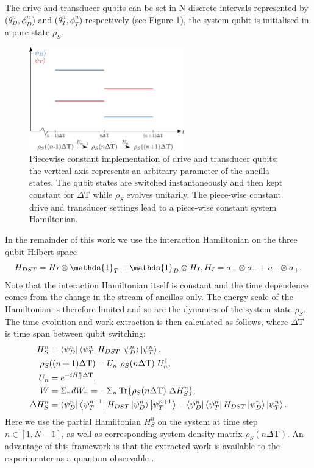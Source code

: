 The drive and transducer qubits can be set in N discrete intervals represented by ($\theta_D^n, \phi_D^n$) and ($\theta_T^n, \phi_T^n$) respectively (see Figure \ref{pwc}), the system qubit is initialised in a pure state $\rho_S$.

\begin{figure}[h]
	\centering
	\includegraphics[width=0.6\textwidth]{img/pwc2}
	\caption{Piecewise constant implementation of drive and transducer qubits: the vertical axis represents an arbitrary parameter of the ancilla states. The qubit states are switched instantaneously and then kept constant for $\Delta \mathrm{T}$ while $\rho_S$ evolves unitarily. The piece-wise constant drive and transducer settings lead to a piece-wise constant system Hamiltonian.}
	\label{pwc}
\end{figure}

\newpage

In the remainder of this work we use the interaction Hamiltonian on the three qubit Hilbert space
\begin{equation*}
H_{DST} = H_{I} \otimes \mathds{1}_T + \mathds{1}_D \otimes H_{I}, \\
H_{I} = \sigma_{+} \otimes \sigma_{-} + \sigma_{-} \otimes \sigma_{+}.
\end{equation*}
Note that the interaction Hamiltonian itself is constant and the time dependence comes from the change in the stream of ancillas only.
The energy scale of the Hamiltonian is therefore limited and so are the dynamics of the system state $\rho_S$.
The time evolution and work extraction is then calculated as follows, where $\Delta \mathrm{T}$ is time span between qubit switching:
\begin{align}
H_S^n &= \bra{\psi_D^n}\bra{\psi_T^n} H_{DST} \ket{\psi_D^n} \ket{\psi_T^n}, \label{relham}\\
\rho_S &((n+1) \Delta \mathrm{T}) = U_n \ \rho_S(n \Delta \mathrm{T}) \ U^{\dagger}_n, \nonumber \\
U_n &= e^{-iH_S^n \Delta \mathrm{T}}, \nonumber \\ 
W &= \Sigma_n dW_n = - \Sigma_n \Tr{\rho_S(n \Delta \mathrm{T}) \ \Delta H_S^n}, \label{dw} \\
\Delta H_S^n &= \bra{\psi_D^n}\bra{\psi_T^{n+1}} H_{DST} \ket{\psi_D^n} \ket{\psi_T^{n+1}} - \bra{\psi_D^n}\bra{\psi_T^n} H_{DST} \ket{\psi_D^n} \ket{\psi_T^n}. \label{deltaham}
\end{align}
Here we use the partial Hamiltonian $H_S^n$ on the system at time step $n \in [1, N - 1]$, as well as corresponding system density matrix $\rho_S(n \Delta \mathrm{T})$.
An advantage of this framework is that the extracted work is available to the experimenter as a quantum observable \cite{beyer2020}.

